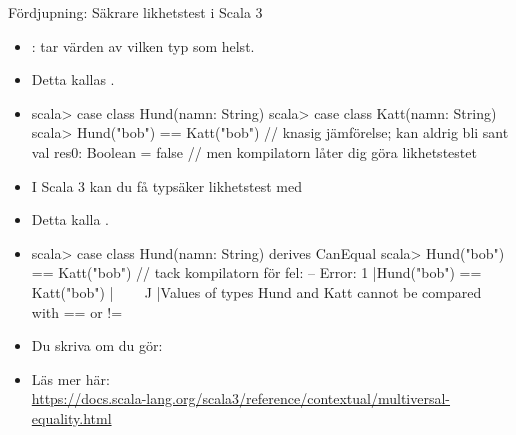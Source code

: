 \begin{Slide}{Fördjupning: Säkrare likhetstest i Scala 3}
\SlideFontSmall
\begin{itemize}
\item {}:  tar värden av vilken typ som helst.
\item Detta kallas .
\item[]
\begin{REPLsmall}
scala> case class Hund(namn: String)
scala> case class Katt(namn: String)
scala> Hund("bob") == Katt("bob") // knasig jämförelse; kan aldrig bli sant
val res0: Boolean = false         // men kompilatorn låter dig göra likhetstestet
\end{REPLsmall}  
\pause
\item I Scala 3 kan du få typsäker likhetstest med~~
\item Detta kalla .
\item[]
\begin{REPLsmall}
scala> case class Hund(namn: String) derives CanEqual
scala> Hund("bob") == Katt("bob")   // tack kompilatorn för fel:
-- Error:
1 |Hund("bob") == Katt("bob")
  |^^^^^^^^^^^^^^^^^^^^^^^^^^
  |Values of types Hund and Katt cannot be compared with == or !=
\end{REPLsmall}  
\item Du  skriva  om du gör: \\ 
\item Läs mer här: \\ \url{https://docs.scala-lang.org/scala3/reference/contextual/multiversal-equality.html}

\end{itemize}

\end{Slide}
